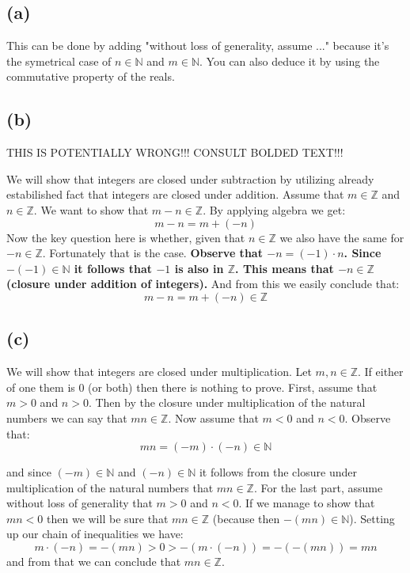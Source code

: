 \documentclass{article}
\begin{document}
\subsection*{(a)}
This can be done by adding "without loss of generality, assume ..." because it's the symetrical case of \(n \in \mathbb{N}\)
and \(m \in \mathbb{N}\). You can also deduce it by using the commutative property of the reals.
\subsection*{(b)}
\begin{center}
    THIS IS POTENTIALLY WRONG!!! CONSULT BOLDED TEXT!!! 
\end{center}
We will show that integers are closed under subtraction by utilizing already estabilished fact that integers
are closed under addition. Assume that \(m \in \mathbb{Z}\) and \(n \in \mathbb{Z}\). We want to show that
\(m - n \in \mathbb{Z}\). By applying algebra we get:
\begin{equation*}
    m - n = m + (-n)
\end{equation*}
Now the key question here is whether, given that \(n \in \mathbb{Z}\) we also have the same for \(-n \in \mathbb{Z}\).
Fortunately that is the case. \textbf{Observe that \(-n = (-1) \cdot n\). Since \(-(-1) \in \mathbb{N}\) it follows that \(-1\) is also in
\(\mathbb{Z}\). This means that \(-n \in \mathbb{Z}\) (closure under addition of integers).} And from this we easily conclude that:
\begin{equation*}
    m - n = m + (-n) \in \mathbb{Z}
\end{equation*}
\subsection*{(c)}
We will show that integers are closed under multiplication. Let \(m, n \in \mathbb{Z}\). If either of one them is \(0\) (or both)
then there is nothing to prove. First, assume that \(m > 0\) and \(n > 0\). Then by the closure under multiplication of the
natural numbers we can say that \(mn \in \mathbb{Z}\). Now assume that \(m < 0\) and \(n < 0\). Observe that:
\begin{equation*}
    mn = (-m) \cdot (-n) \in \mathbb{N}
\end{equation*}

and since \((-m) \in \mathbb{N}\) and \((-n) \in \mathbb{N}\) it follows from the closure under multiplication of the natural numbers
that \(mn \in \mathbb{Z}\). For the last part, assume without loss of generality that \(m > 0\) and \(n < 0\). If we
manage to show that \(mn < 0\) then we will be sure that \(mn \in \mathbb{Z}\) (because then \(-(mn) \in \mathbb{N}\)).
Setting up our chain of inequalities we have:
\begin{equation*}
    m \cdot (-n) = -(mn) > 0 > - (m \cdot (-n)) = - (-(mn)) = mn
\end{equation*}
and from that we can conclude that \(mn \in \mathbb{Z}\).
\end{document}
